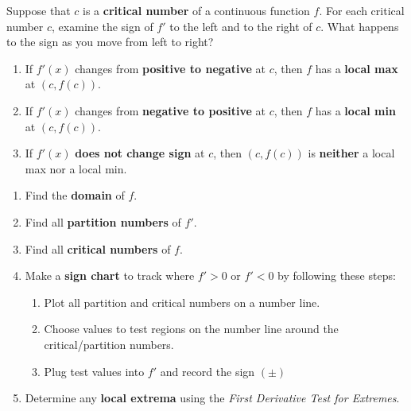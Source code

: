 \begin{tcolorbox}[title = {The First Derivative Test for Extremes:}]

Suppose that $c$ is a \textbf{critical number} of a continuous function $f$. For each critical number $c$, examine the sign of $f'$ to the left and to the right of $c$. What happens to the sign as you move from left to right?
\renewcommand{\labelenumi}{(\alph{enumi})}
\begin{enumerate}[leftmargin=*]

    \item If $f'(x)$ changes from \textbf{positive to negative} at $c$, then $f$ has a \textbf{local max} at $(c,f(c))$.
    \item If $f'(x)$ changes from \textbf{negative to positive} at $c$, then $f$ has a \textbf{local min} at $(c,f(c))$.
    \item If $f'(x)$ \textbf{does not change sign} at $c$, then $(c,f(c))$ is \textbf{neither} a local max nor a local min.
\end{enumerate}
\end{tcolorbox}

\begin{tcolorbox}[title={Steps for finding where $f$ is Increasing/Decreasing or any Local Extrema}]
\begin{enumerate}[leftmargin=*]
    \item Find the \textbf{domain} of $f$.
    \item Find all \textbf{partition numbers} of $f'$.
    \item Find all \textbf{critical numbers} of $f$.
    \item Make a \textbf{sign chart} to track where $f'>0$ or $f'<0$ by following these steps:
    \renewcommand{\labelenumii}{(\roman{enumii})}
    \begin{enumerate}
        \item Plot all partition and critical numbers on a number line.
        \item Choose values to test regions on the number line around the critical/partition numbers.
        \item Plug test values into $f'$ and record the sign $(\pm)$
    \end{enumerate}
    \item Determine any \textbf{local extrema} using the \emph{First Derivative Test for Extremes}.
\end{enumerate}
\end{tcolorbox}

